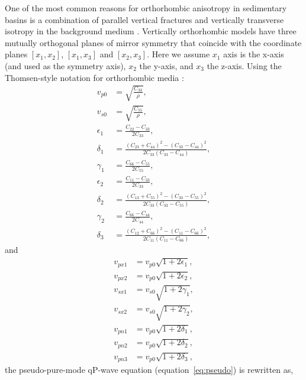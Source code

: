 One of the most common reasons for orthorhombic anisotropy in sedimentary basins is a combination of parallel 
vertical fractures and vertically transverse isotropy in the background medium \cite[]{wild.crampin:1991,
schoenberg.helbig:1997}.
Vertically orthorhombic models have three mutually
orthogonal planes of mirror symmetry that coincide with the coordinate planes $[x_{1},x_{2}]$, $[x_{1},x_{3}]$ and
 $[x_{2},x_{3}]$. Here we assume $x_{1}$ axis is the x-axis (and used as the symmetry axis),
 $x_{2}$ the y-axis, and $x_{3}$ the z-axis.
Using the Thomsen-style notation for orthorhombic media \cite[]{tsvankin:1997b}:
\begin{equation}
\begin{split}
v_{p0}&=\sqrt{\frac{C_{33}}{\rho}}, \\
v_{s0}&=\sqrt{\frac{C_{55}}{\rho}}, \\
\epsilon_{1}&=\frac{C_{22}-C_{33}}{2C_{33}}, \\
\delta_{1}&=\frac{(C_{23}+C_{44})^2-(C_{33}-C_{44})^2}{2C_{33}(C_{33}-C_{44})}, \\
\gamma_{1}&=\frac{C_{66}-C_{55}}{2C_{55}}, \\
\epsilon_{2}&=\frac{C_{11}-C_{33}}{2C_{33}}, \\
\delta_{2}&=\frac{(C_{13}+C_{55})^2-(C_{33}-C_{55})^2}{2C_{33}(C_{33}-C_{55})}, \\
\gamma_{2}&=\frac{C_{66}-C_{44}}{2C_{44}}, \\
\delta_{3}&=\frac{(C_{12}+C_{66})^2-(C_{11}-C_{66})^2}{2C_{11}(C_{11}-C_{66})}, 
\end{split}
\end{equation}
	and
\begin{equation}
\begin{split}
v_{px1}&=v_{p0}\sqrt{1+2\epsilon_{1}}, \\
v_{px2}&=v_{p0}\sqrt{1+2\epsilon_{2}}, \\
v_{sx1}&=v_{s0}\sqrt{1+2\gamma_{1}}, \\
v_{sx2}&=v_{s0}\sqrt{1+2\gamma_{2}}, \\
v_{pn1}&= v_{p0}\sqrt{1+2\delta_{1}}, \\
v_{pn2}&= v_{p0}\sqrt{1+2\delta_{2}}, \\
v_{pn3}&= v_{p0}\sqrt{1+2\delta_{3}},
\end{split}
\end{equation}
the pseudo-pure-mode qP-wave equation (equation~\ref{eq:pseudo}) is rewritten as,
